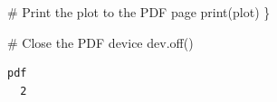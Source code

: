 \documentclass[
  letterpaper,
  DIV=11,
  numbers=noendperiod]{scrartcl}
\newenvironment{Shaded}{\begin{snugshade}}{\end{snugshade}}
\newcommand{\CommentTok}[1]{\textcolor[rgb]{0.37,0.37,0.37}{#1}}
\newcommand{\FunctionTok}[1]{\textcolor[rgb]{0.28,0.35,0.67}{#1}}
\newcommand{\NormalTok}[1]{\textcolor[rgb]{0.00,0.23,0.31}{#1}}
\begin{document}
\begin{Shaded}
\begin{Highlighting}[]
  \CommentTok{\# Print the plot to the PDF page}
  \FunctionTok{print}\NormalTok{(plot)}
\NormalTok{\}}

\CommentTok{\# Close the PDF device}
\FunctionTok{dev.off}\NormalTok{()}
\end{Highlighting}
\end{Shaded}

\begin{verbatim}
pdf 
  2 
\end{verbatim}
\end{document}
